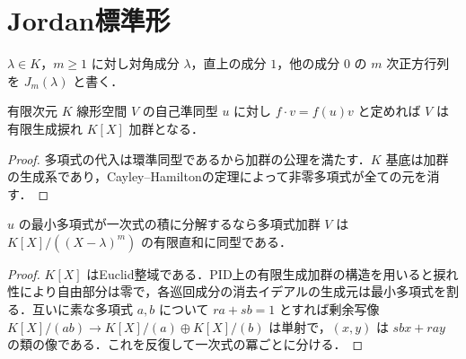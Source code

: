 \section{Jordan標準形}
\begin{defn}[Jordanブロック]
$\lambda\in K$，$m\geq1$ に対し対角成分 $\lambda$，直上の成分 $1$，他の成分 $0$ の $m$ 次正方行列を $J_m(\lambda)$ と書く．
\end{defn}
\begin{prop}[自己準同型からの多項式加群]
有限次元 $K$ 線形空間 $V$ の自己準同型 $u$ に対し $f\cdot v=f(u)v$ と定めれば $V$ は有限生成捩れ $K[X]$ 加群となる．
\end{prop}
\begin{proof}
多項式の代入は環準同型であるから加群の公理を満たす．$K$ 基底は加群の生成系であり，Cayley–Hamiltonの定理によって非零多項式が全ての元を消す．
\end{proof}
\begin{prop}[巡回成分への分解]
$u$ の最小多項式が一次式の積に分解するなら多項式加群 $V$ は $K[X]/((X-\lambda)^m)$ の有限直和に同型である．
\end{prop}
\begin{proof}
$K[X]$ はEuclid整域である．PID上の有限生成加群の構造を用いると捩れ性により自由部分は零で，各巡回成分の消去イデアルの生成元は最小多項式を割る．互いに素な多項式 $a,b$ について $ra+sb=1$ とすれば剰余写像 $K[X]/(ab)\to K[X]/(a)\oplus K[X]/(b)$ は単射で，$(x,y)$ は $sbx+ray$ の類の像である．これを反復して一次式の冪ごとに分ける．
\end{proof}
